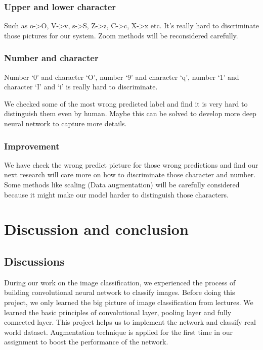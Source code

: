 \documentclass[twoside,twocolumn,10.8pt]{article}
\begin{document}
\subsubsection{Upper and lower character}

Such as o->O, V->v, s->S, Z->z, C->c, X->x etc. It's really hard to discriminate those pictures for our system. Zoom methods will be reconsidered carefully. 

\subsubsection{Number and character}

\noindent Number ‘0’ and character ‘O’, number ‘9’ and character ‘q’, number ‘1’ and character ‘I’ and ‘i’ is really hard to discriminate.

\noindent We checked some of the most wrong predicted label and find it is very hard to distinguish them even by human. Maybe this can be solved to develop more deep neural network to capture more details.

\subsubsection{Improvement}

We have check the wrong predict picture for those wrong predictions and find our next research will care more on how to discriminate those character and number. Some methods like scaling (Data augmentation) will be carefully considered because it might make our model harder to distinguish those characters.


\section{Discussion and conclusion}
\subsection{Discussions}

During our work on the image classification, we experienced the process of building convolutional neural network to classify images. Before doing this project, we only learned the big picture of image classification from lectures. We learned the basic principles of convolutional layer, pooling layer and fully connected layer. This project helps us to implement the network and classify real world dataset. Augmentation technique is applied for the first time in our assignment to boost the performance of the network.
\end{document}
